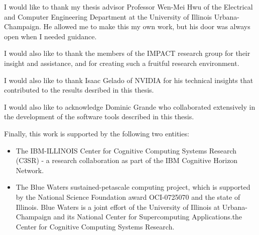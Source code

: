 I would like to thank my thesis advisor Professor Wen-Mei Hwu of the Electrical and Computer Engineering Department at the University of Illinois Urbana-Champaign.
He allowed me to make this my own work, but his door was always open when I needed guidance.

I would also like to thank the members of the IMPACT research group for their insight and assistance, and for creating such a fruitful research environment.

I would also like to thank Isaac Gelado of NVIDIA for his technical insights that contributed to the results desribed in this thesis.

I would also like to acknowledge Dominic Grande who collaborated extensively in the development of the software tools described in this thesis.

Finally, this work is supported by the following two entities:
\begin{itemize}
    \item The IBM-ILLINOIS Center for Cognitive Computing Systems Research (C3SR) - a research collaboration as part of the IBM Cognitive Horizon Network.
    \item The Blue Waters sustained-petascale computing project, which is supported by the National Science Foundation award OCI-0725070 and the state of Illinois. 
Blue Waters is a joint effort of the University of Illinois at Urbana-Champaign and its National Center for Supercomputing Applications.the Center for Cognitive Computing Systems Research.
\end{itemize}